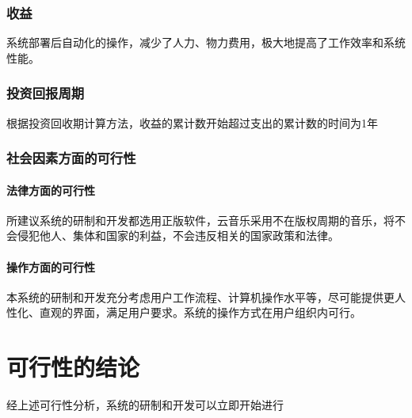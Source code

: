 \subsubsection{收益}
系统部署后自动化的操作，减少了人力、物力费用，极大地提高了工作效率和系统性能。 
\subsubsection{投资回报周期}
根据投资回收期计算方法，收益的累计数开始超过支出的累计数的时间为1年
\subsubsection{社会因素方面的可行性}
\paragraph{法律方面的可行性}

所建议系统的研制和开发都选用正版软件，云音乐采用不在版权周期的音乐，将不会侵犯他人、集体和国家的利益，不会违反相关的国家政策和法律。 

\paragraph{操作方面的可行性}
本系统的研制和开发充分考虑用户工作流程、计算机操作水平等，尽可能提供更人性化、直观的界面，满足用户要求。系统的操作方式在用户组织内可行。 
\section{可行性的结论}
经上述可行性分析，系统的研制和开发可以立即开始进行